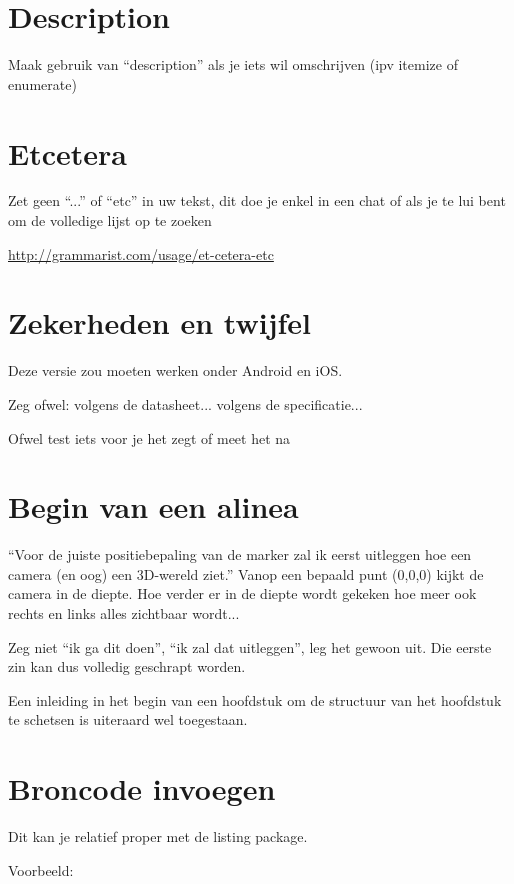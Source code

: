 \section{Description}
Maak gebruik van ``description{}'' als je iets wil omschrijven (ipv itemize of enumerate)

\section{Etcetera}
Zet geen ``...'' of ``etc'' in uw tekst, dit doe je enkel in een chat of als je te lui bent om de volledige lijst op te zoeken

\url{http://grammarist.com/usage/et-cetera-etc}


\section{Zekerheden en twijfel}

Deze versie zou moeten werken onder Android en iOS.

Zeg ofwel: volgens de datasheet... volgens de specificatie...

Ofwel test iets voor je het zegt of meet het na


\section{Begin van een alinea}
``Voor de juiste positiebepaling van de marker zal ik eerst uitleggen hoe een camera (en oog) een 3D-wereld ziet.''
Vanop een bepaald punt (0,0,0) kijkt de camera in de diepte. Hoe verder er in de diepte wordt
gekeken hoe meer ook rechts en links alles zichtbaar wordt...

Zeg niet ``ik ga dit doen'', ``ik zal dat uitleggen'', leg het gewoon uit. Die eerste zin kan dus volledig geschrapt worden.

Een inleiding in het begin van een hoofdstuk om de structuur van het hoofdstuk te schetsen is uiteraard wel toegestaan.


\section{Broncode invoegen}

Dit kan je relatief proper met de listing package.

Voorbeeld:

\lstset{numbers=left, stepnumber=1, basicstyle=\footnotesize, language=C++, caption=AcceleroDice: Minimal Implementation, label=AcceleroDice, frame=none, xleftmargin=.3in}







